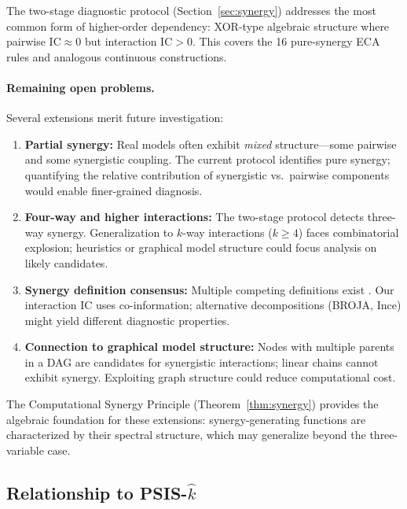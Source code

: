 \documentclass[10pt]{article} %
\theoremstyle{plain}
\theoremstyle{definition}
\newcommand{\IC}{\mathrm{IC}}  %
\begin{document}
The two-stage diagnostic protocol (Section~\ref{sec:synergy}) addresses the most common form of higher-order dependency: XOR-type algebraic structure where pairwise $\IC \approx 0$ but interaction $\IC > 0$. This covers the 16 pure-synergy ECA rules and analogous continuous constructions.

\paragraph{Remaining open problems.} Several extensions merit future investigation:

\begin{enumerate}
    \item \textbf{Partial synergy:} Real models often exhibit \emph{mixed} structure---some pairwise and some synergistic coupling. The current protocol identifies pure synergy; quantifying the relative contribution of synergistic vs.\ pairwise components would enable finer-grained diagnosis.
    
    \item \textbf{Four-way and higher interactions:} The two-stage protocol detects three-way synergy. Generalization to $k$-way interactions ($k \geq 4$) faces combinatorial explosion; heuristics or graphical model structure could focus analysis on likely candidates.
    
    \item \textbf{Synergy definition consensus:} Multiple competing definitions exist \citep{williams2010nonnegative}. Our interaction IC uses co-information; alternative decompositions (BROJA, Ince) might yield different diagnostic properties.
    
    \item \textbf{Connection to graphical model structure:} Nodes with multiple parents in a DAG are candidates for synergistic interactions; linear chains cannot exhibit synergy. Exploiting graph structure could reduce computational cost.
\end{enumerate}

\noindent The Computational Synergy Principle (Theorem~\ref{thm:synergy}) provides the algebraic foundation for these extensions: synergy-generating functions are characterized by their spectral structure, which may generalize beyond the three-variable case.

\subsection{Relationship to PSIS-$\hat{k}$}
\end{document}
